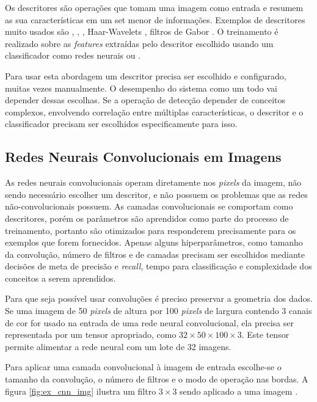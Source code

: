 Os descritores são operações que tomam uma imagem como entrada e resumem as sua
características em um set menor de informações. Exemplos de descritores muito
usados são
	\cite{wang1990texture},
 \cite{rublee2011orb},
 \cite{dalal2005histograms},
Haar-Wavelets \cite{nabout2008object},
filtros de Gabor \cite{riaz2012invariant}.
O treinamento é realizado sobre
as \emph{features} extraídas pelo descritor escolhido usando um
classificador como redes neurais ou .

Para usar esta abordagem um descritor precisa ser escolhido e configurado,
muitas vezes manualmente. O desempenho do sistema como um todo vai depender
dessas escolhas. Se a operação de detecção depender de conceitos complexos,
envolvendo correlação entre múltiplas características, o descritor e o
classificador precisam ser escolhidos especificamente para isso.

\subsection{Redes Neurais Convolucionais em Imagens}
As redes neurais convolucionais operam diretamente nos \emph{pixels} da imagem,
não sendo necessário escolher um descritor, e não possuem os problemas que as
redes não-convolucionais possuem. As camadas convolucionais se comportam como
descritores, porém os parâmetros são aprendidos como parte do processo de
treinamento, portanto são otimizados para responderem precisamente para os
exemplos que forem fornecidos. Apenas alguns hiperparâmetros, como tamanho
da convolução, número de filtros e de camadas precisam ser escolhidos mediante
decisões de meta de precisão e \emph{recall}, tempo para classificação e
complexidade dos conceitos a serem aprendidos.

Para que seja possível usar convoluções é preciso preservar a
geometria dos dados. Se uma imagem de 50
\emph{pixels} de altura por 100 \emph{pixels} de largura contendo 3 canais de
cor for usado na
entrada de uma rede neural convolucional, ela precisa ser representada por um
tensor apropriado, como $32 \times 50 \times 100 \times 3$. Este tensor
permite alimentar a rede neural com um lote de 32 imagens.

Para aplicar uma camada convolucional à imagem de entrada escolhe-se o tamanho
da convolução, o número de filtros e o modo de operação nas bordas. A figura
\ref{fig:ex_cnn_img} ilustra um filtro $3 \times 3$ sendo aplicado a uma imagem
.

